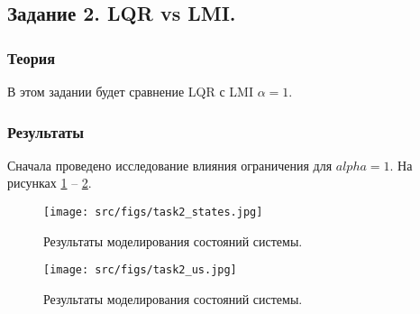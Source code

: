 \subsection{Задание 2. LQR vs LMI.}
\subsubsection{Теория}
В этом задании будет сравнение LQR с LMI \(\alpha = 1\).

\subsubsection{Результаты}
Сначала проведено исследование влияния ограничения для \(alpha = 1\).  На рисунках \ref{fig:task2_states} -- \ref{fig:task2_us}.



\begin{figure}[ht!]
    \centering
    \texttt{[image: src/figs/task2\_states.jpg]}
    \caption{Результаты моделирования состояний системы.}
    \label{fig:task2_states}
\end{figure}
\begin{figure}[ht!]
    \centering
    \texttt{[image: src/figs/task2\_us.jpg]}
    \caption{Результаты моделирования состояний системы.}
    \label{fig:task2_us}
\end{figure}
\FloatBarrier